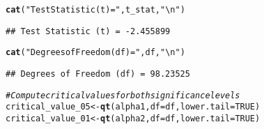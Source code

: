 \documentclass{article}\usepackage[]{graphicx}\usepackage[]{xcolor}
\makeatletter
\newcommand{\hlnum}[1]{\textcolor[rgb]{0.686,0.059,0.569}{#1}}%
\newcommand{\hlsng}[1]{\textcolor[rgb]{0.192,0.494,0.8}{#1}}%
\newcommand{\hlcom}[1]{\textcolor[rgb]{0.678,0.584,0.686}{\textit{#1}}}%
\newcommand{\hldef}[1]{\textcolor[rgb]{0.345,0.345,0.345}{#1}}%
\newcommand{\hlkwb}[1]{\textcolor[rgb]{0.69,0.353,0.396}{#1}}%
\newcommand{\hlkwc}[1]{\textcolor[rgb]{0.333,0.667,0.333}{#1}}%
\newcommand{\hlkwd}[1]{\textcolor[rgb]{0.737,0.353,0.396}{\textbf{#1}}}%
\newenvironment{kframe}{%
 \def\at@end@of@kframe{}%
 \ifinner\ifhmode%
  \def\at@end@of@kframe{\end{minipage}}%
  \begin{minipage}{\columnwidth}%
 \fi\fi%
 \def\FrameCommand##1{\hskip\@totalleftmargin \hskip-\fboxsep
 \colorbox{shadecolor}{##1}\hskip-\fboxsep
     \hskip-\linewidth \hskip-\@totalleftmargin \hskip\columnwidth}%
 \MakeFramed {\advance\hsize-\width
   \@totalleftmargin\z@ \linewidth\hsize
   \@setminipage}}%
 {\par\unskip\endMakeFramed%
 \at@end@of@kframe}
\newenvironment{knitrout}{}{} %
\makeatother
\begin{document}
\begin{knitrout}
\begin{kframe}
\begin{alltt}
\hlkwd{cat}\hldef{(}\hlsng{"Test Statistic (t) ="}\hldef{, t_stat,} \hlsng{"\textbackslash{}n"}\hldef{)}
\end{alltt}
\begin{verbatim}
## Test Statistic (t) = -2.455899
\end{verbatim}
\begin{alltt}
\hlkwd{cat}\hldef{(}\hlsng{"Degrees of Freedom (df) ="}\hldef{, df,} \hlsng{"\textbackslash{}n"}\hldef{)}
\end{alltt}
\begin{verbatim}
## Degrees of Freedom (df) = 98.23525
\end{verbatim}
\begin{alltt}
\hlcom{# Compute critical values for both significance levels}
\hldef{critical_value_05} \hlkwb{<-} \hlkwd{qt}\hldef{(alpha1,} \hlkwc{df} \hldef{= df,} \hlkwc{lower.tail} \hldef{=} \hlnum{TRUE}\hldef{)}
\hldef{critical_value_01} \hlkwb{<-} \hlkwd{qt}\hldef{(alpha2,} \hlkwc{df} \hldef{= df,} \hlkwc{lower.tail} \hldef{=} \hlnum{TRUE}\hldef{)}


\end{alltt}
\end{kframe}
\end{knitrout}
\end{document}
